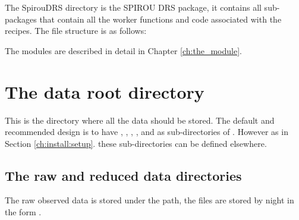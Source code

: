 The SpirouDRS directory is the SPIROU DRS package, it contains all sub-packages that contain all the worker functions and code associated with the recipes. The file structure is as follows:

\begin{tcustomdir}
\end{tcustomdir}

The modules are described in detail in Chapter \ref{ch:the_module}.

\fi

\clearpage
\newpage
\section{The data root directory}
\label{ch:data_architecture:data_root_folder}

This is the directory where all the data should be stored. The default and recommended design is to have , , , 
, and  as sub-directories of . However as in Section \ref{ch:install:setup}. these sub-directories can be defined elsewhere.

\subsection{The raw and reduced data directories}
\label{ch:data_architecture:data_root_folderraw_folder}
The raw observed data is stored under the  path, the files are stored by night in the form \constantFolderDateFormat. \\

